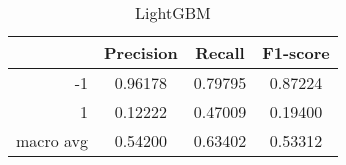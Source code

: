 \begin{table}[!h]
    \centering
    \renewcommand{\arraystretch}{1.5}
    \begin{tabular}{|r|c|c|c|}
        \hline
                  & Precision & Recall & F1-score \\ \hline
        -1        &     0.96178     &     0.79795   &    0.87224      \\ \hline
        1         &     0.12222      &     0.47009   &   0.19400       \\ \hline
        macro avg &      0.54200     &     0.63402   &    0.53312      \\ \hline
    \end{tabular}
    \caption{LightGBM}
\end{table}
